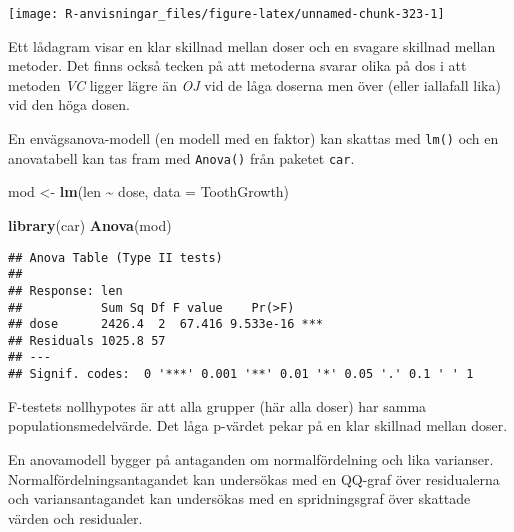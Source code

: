 \documentclass[
]{book}
\newenvironment{Shaded}{\begin{snugshade}}{\end{snugshade}}
\newcommand{\AttributeTok}[1]{\textcolor[rgb]{0.13,0.29,0.53}{#1}}
\newcommand{\FunctionTok}[1]{\textcolor[rgb]{0.13,0.29,0.53}{\textbf{#1}}}
\newcommand{\NormalTok}[1]{#1}
\newcommand{\OtherTok}[1]{\textcolor[rgb]{0.56,0.35,0.01}{#1}}
\newcommand{\SpecialCharTok}[1]{\textcolor[rgb]{0.81,0.36,0.00}{\textbf{#1}}}
\theoremstyle{definition}
\theoremstyle{definition}
\theoremstyle{definition}
\theoremstyle{definition}
\theoremstyle{remark}
\begin{document}
\begin{center}\texttt{[image: R-anvisningar\_files/figure-latex/unnamed-chunk-323-1]} \end{center}

Ett lådagram visar en klar skillnad mellan doser och en svagare skillnad mellan metoder. Det finns också tecken på att metoderna svarar olika på dos i att metoden \emph{VC} ligger lägre än \emph{OJ} vid de låga doserna men över (eller iallafall lika) vid den höga dosen.

En envägsanova-modell (en modell med en faktor) kan skattas med \texttt{lm()} och en anovatabell kan tas fram med \texttt{Anova()} från paketet \texttt{car}.

\begin{Shaded}
\begin{Highlighting}[]
\NormalTok{mod }\OtherTok{\textless{}{-}} \FunctionTok{lm}\NormalTok{(len }\SpecialCharTok{\textasciitilde{}}\NormalTok{ dose, }\AttributeTok{data =}\NormalTok{ ToothGrowth)}

\FunctionTok{library}\NormalTok{(car)}
\FunctionTok{Anova}\NormalTok{(mod)}
\end{Highlighting}
\end{Shaded}

\begin{verbatim}
## Anova Table (Type II tests)
## 
## Response: len
##           Sum Sq Df F value    Pr(>F)    
## dose      2426.4  2  67.416 9.533e-16 ***
## Residuals 1025.8 57                      
## ---
## Signif. codes:  0 '***' 0.001 '**' 0.01 '*' 0.05 '.' 0.1 ' ' 1
\end{verbatim}

F-testets nollhypotes är att alla grupper (här alla doser) har samma populationsmedelvärde. Det låga p-värdet pekar på en klar skillnad mellan doser.

En anovamodell bygger på antaganden om normalfördelning och lika varianser. Normalfördelningsantagandet kan undersökas med en QQ-graf över residualerna och variansantagandet kan undersökas med en spridningsgraf över skattade värden och residualer.
\end{document}
